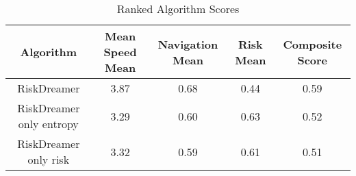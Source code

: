 \begin{table}[htbp]
    \centering
    \caption{Ranked Algorithm Scores}
    \begin{tabular}{ccccc}
    \toprule
    Algorithm & Mean Speed Mean & Navigation Mean & Risk Mean & Composite Score \\
    \midrule
    RiskDreamer & 3.87 & 0.68 & 0.44 & 0.59 \\
    RiskDreamer only entropy & 3.29 & 0.60 & 0.63 & 0.52 \\
    RiskDreamer only risk & 3.32 & 0.59 & 0.61 & 0.51 \\
    \bottomrule
    \end{tabular}
\end{table}